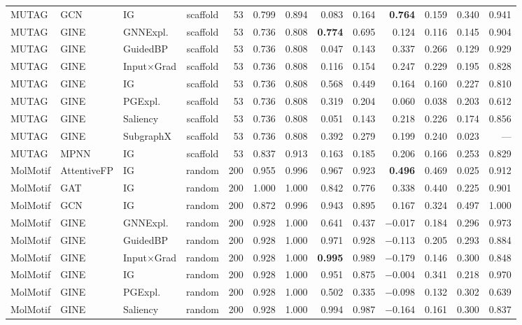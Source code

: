 \begin{table}[t]
{\begin{tabular}{lllcrrrrrrrrr}
MUTAG & GCN & IG & scaffold & 53 & 0.799 & 0.894 & 0.083 & 0.164 & \textbf{0.764} & 0.159 & 0.340 & 0.941 \\
MUTAG & GINE & GNNExpl. & scaffold & 53 & 0.736 & 0.808 & \textbf{0.774} & 0.695 & 0.124 & 0.116 & 0.145 & 0.904 \\
MUTAG & GINE & GuidedBP & scaffold & 53 & 0.736 & 0.808 & 0.047 & 0.143 & 0.337 & 0.266 & 0.129 & 0.929 \\
MUTAG & GINE & Input$\times$Grad & scaffold & 53 & 0.736 & 0.808 & 0.116 & 0.154 & 0.247 & 0.229 & 0.195 & 0.828 \\
MUTAG & GINE & IG & scaffold & 53 & 0.736 & 0.808 & 0.568 & 0.449 & 0.164 & 0.160 & 0.227 & 0.810 \\
MUTAG & GINE & PGExpl. & scaffold & 53 & 0.736 & 0.808 & 0.319 & 0.204 & 0.060 & 0.038 & 0.203 & 0.612 \\
MUTAG & GINE & Saliency & scaffold & 53 & 0.736 & 0.808 & 0.051 & 0.143 & 0.218 & 0.226 & 0.174 & 0.856 \\
MUTAG & GINE & SubgraphX & scaffold & 53 & 0.736 & 0.808 & 0.392 & 0.279 & 0.199 & 0.240 & 0.023 & --- \\
MUTAG & MPNN & IG & scaffold & 53 & 0.837 & 0.913 & 0.163 & 0.185 & 0.206 & 0.166 & 0.253 & 0.829 \\
\addlinespace[2pt]
MolMotif & AttentiveFP & IG & random & 200 & 0.955 & 0.996 & 0.967 & 0.923 & \textbf{0.496} & 0.469 & 0.025 & 0.912 \\
MolMotif & GAT & IG & random & 200 & 1.000 & 1.000 & 0.842 & 0.776 & 0.338 & 0.440 & 0.225 & 0.901 \\
MolMotif & GCN & IG & random & 200 & 0.872 & 0.996 & 0.943 & 0.895 & 0.167 & 0.324 & 0.497 & 1.000 \\
MolMotif & GINE & GNNExpl. & random & 200 & 0.928 & 1.000 & 0.641 & 0.437 & $-$0.017 & 0.184 & 0.296 & 0.973 \\
MolMotif & GINE & GuidedBP & random & 200 & 0.928 & 1.000 & 0.971 & 0.928 & $-$0.113 & 0.205 & 0.293 & 0.884 \\
MolMotif & GINE & Input$\times$Grad & random & 200 & 0.928 & 1.000 & \textbf{0.995} & 0.989 & $-$0.179 & 0.146 & 0.300 & 0.848 \\
MolMotif & GINE & IG & random & 200 & 0.928 & 1.000 & 0.951 & 0.875 & $-$0.004 & 0.341 & 0.218 & 0.970 \\
MolMotif & GINE & PGExpl. & random & 200 & 0.928 & 1.000 & 0.502 & 0.335 & $-$0.098 & 0.132 & 0.302 & 0.639 \\
MolMotif & GINE & Saliency & random & 200 & 0.928 & 1.000 & 0.994 & 0.987 & $-$0.164 & 0.161 & 0.300 & 0.837 \\

\end{tabular}}
\end{table}
